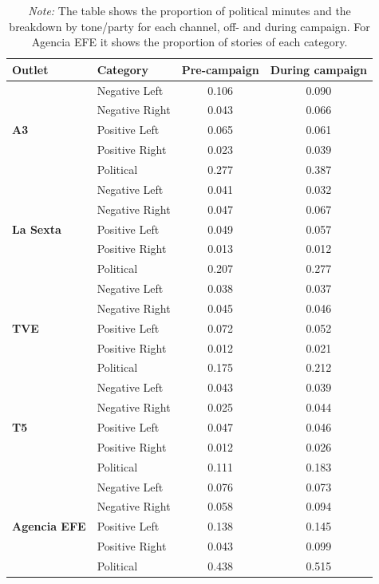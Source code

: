 \documentclass[12pt]{article}
\begin{document}
	\begin{table}[!htbp]
		\centering
		\caption{Proportion of Political Content and Sentiment by Channel}
		\begin{tabular}{llcc}
			\toprule
			\textbf{Outlet} & \textbf{Category} & \textbf{Pre-campaign} & \textbf{During campaign} \\
			\midrule
			\midrule
			\multirow{5}{*}{\textbf{A3}}& Negative Left & 0.106 & 0.090 \\
			& Negative Right & 0.043 & 0.066 \\
			& Positive Left & 0.065 & 0.061 \\
			& Positive Right & 0.023 & 0.039 \\
			& Political & 0.277 & 0.387 \\
			\midrule
			\multirow{5}{*}{\textbf{La Sexta}}& Negative Left & 0.041 & 0.032 \\
			& Negative Right & 0.047 & 0.067 \\
			& Positive Left & 0.049 & 0.057 \\
			& Positive Right & 0.013 & 0.012 \\
			& Political & 0.207 & 0.277 \\
			\midrule
			\multirow{5}{*}{\textbf{TVE}}& Negative Left & 0.038 & 0.037 \\
			& Negative Right & 0.045 & 0.046 \\
			& Positive Left & 0.072 & 0.052 \\
			& Positive Right & 0.012 & 0.021 \\
			& Political & 0.175 & 0.212 \\
			\midrule
			\multirow{5}{*}{\textbf{T5}}& Negative Left & 0.043 & 0.039 \\
			& Negative Right & 0.025 & 0.044 \\
			& Positive Left & 0.047 & 0.046 \\
			& Positive Right & 0.012 & 0.026 \\
			& Political & 0.111 & 0.183 \\
			\bottomrule
				\multirow{5}{*}{\textbf{Agencia EFE}} & Negative Left & 0.076 & 0.073 \\
			& Negative Right & 0.058 & 0.094\\
			& Positive Left & 0.138 & 0.145 \\
			& Positive Right & 0.043 & 0.099\\
			& Political & 0.438 & 0.515 \\
			\bottomrule
			
		\end{tabular}
		\caption*{\small \textit{Note:} The table shows the proportion of political minutes and the breakdown by tone/party for each channel, off- and during campaign. For Agencia EFE it shows the proportion of stories of each category. }
		\label{tab:political_sentiment_types}
	\end{table}
	
\end{document}
